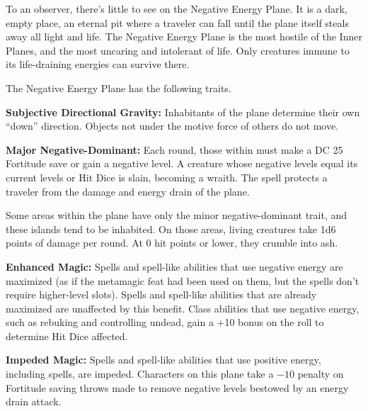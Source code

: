 To an observer, there's little to see on the Negative Energy Plane. It is a dark, empty place, an eternal pit where a traveler can fall until the plane itself steals away all light and life. The Negative Energy Plane is the most hostile of the Inner Planes, and the most uncaring and intolerant of life. Only creatures immune to its life-draining energies can survive there.

The Negative Energy Plane has the following traits.
\begin{itemize*}
\item \textbf{Subjective Directional Gravity:} Inhabitants of the plane determine their own ``down'' direction. Objects not under the motive force of others do not move.
\item \textbf{Major Negative-Dominant:} Each round, those within must make a DC 25 Fortitude save or gain a negative level. A creature whose negative levels equal its current levels or Hit Dice is slain, becoming a wraith. The  spell protects a traveler from the damage and energy drain of the plane.

Some areas within the plane have only the minor negative-dominant trait, and these islands tend to be inhabited. On those areas, living creatures take 1d6 points of damage per round. At 0 hit points or lower, they crumble into ash.
\item \textbf{Enhanced Magic:} Spells and spell-like abilities that use negative energy are maximized (as if the  metamagic feat had been used on them, but the spells don't require higher-level slots). Spells and spell-like abilities that are already maximized are unaffected by this benefit. Class abilities that use negative energy, such as rebuking and controlling undead, gain a +10 bonus on the roll to determine Hit Dice affected.
\item \textbf{Impeded Magic:} Spells and spell-like abilities that use positive energy, including  spells, are impeded. Characters on this plane take a $-10$ penalty on Fortitude saving throws made to remove negative levels bestowed by an energy drain attack.
\end{itemize*}
